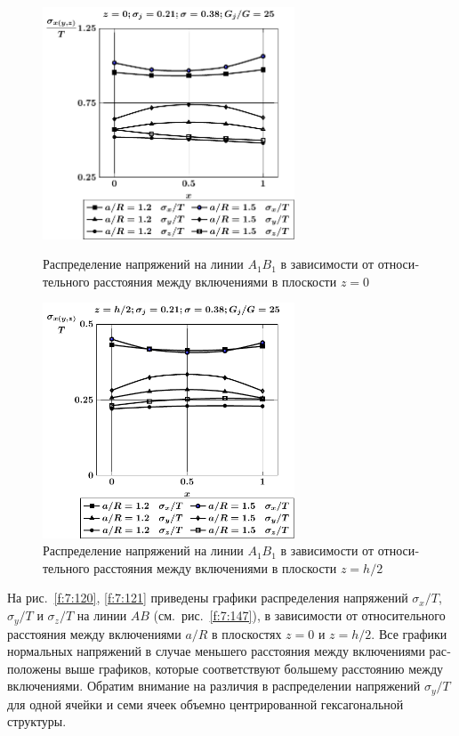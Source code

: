 \begin{russian}
\begin{figure}[h!]
\centering\footnotesize
\parbox[b]{7.5cm}{\centering\includegraphics[width=7.5cm]{inc31-a-h10-r10-g25-a1b1-z0.pdf}
\caption{Распределение напряжений на линии $A_1B_1$ в зависимости от относительного расстояния между включениями в плоскости $z=0$
\label{f:7:122}}}\hfil\hfil
\parbox[b]{7.5cm}{\centering\includegraphics[width=7.5cm]{inc31-a-h10-r10-g25-a1b1-z1.pdf}
\caption{Распределение напряжений на линии $A_1B_1$ в зависимости от относительного расстояния между включениями в плоскости $z=h/2$
\label{f:7:123}}}
\end{figure}

На рис.~\ref{f:7:120}, \ref{f:7:121} приведены графики распределения напряжений $\sigma_x/T$, $\sigma_y/T$ и $\sigma_z/T$ на линии $AB$ (см.~рис.~\ref{f:7:147}), в зависимости от относительного расстояния между включениями $a/R$ в плоскостях $z=0$ и $z=h/2$. Все графики нормальных напряжений в случае меньшего расстояния между включениями расположены выше графиков, которые соответствуют большему расстоянию между включениями. Обратим внимание на различия в распределении напряжений $\sigma_y/T$ для одной ячейки и семи ячеек объемно центрированной гексагональной структуры.


\end{russian}
